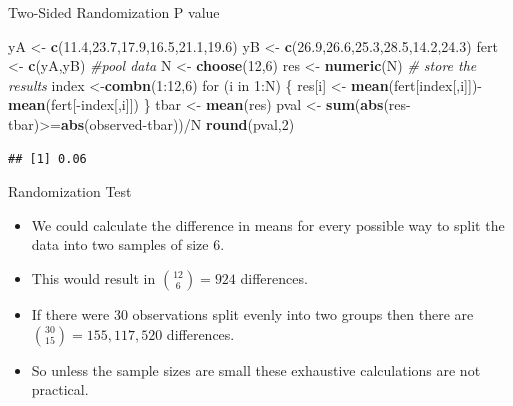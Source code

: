 \documentclass[9pt,ignorenonframetext,]{beamer}
\newenvironment{Shaded}{\begin{snugshade}}{\end{snugshade}}
\newcommand{\KeywordTok}[1]{\textcolor[rgb]{0.13,0.29,0.53}{\textbf{{#1}}}}
\newcommand{\DecValTok}[1]{\textcolor[rgb]{0.00,0.00,0.81}{{#1}}}
\newcommand{\FloatTok}[1]{\textcolor[rgb]{0.00,0.00,0.81}{{#1}}}
\newcommand{\StringTok}[1]{\textcolor[rgb]{0.31,0.60,0.02}{{#1}}}
\newcommand{\CommentTok}[1]{\textcolor[rgb]{0.56,0.35,0.01}{\textit{{#1}}}}
\newcommand{\NormalTok}[1]{{#1}}
\begin{document}
\begin{frame}[fragile]{Two-Sided Randomization P value}

\begin{Shaded}
\begin{Highlighting}[]
\NormalTok{yA <-}\StringTok{ }\KeywordTok{c}\NormalTok{(}\FloatTok{11.4}\NormalTok{,}\FloatTok{23.7}\NormalTok{,}\FloatTok{17.9}\NormalTok{,}\FloatTok{16.5}\NormalTok{,}\FloatTok{21.1}\NormalTok{,}\FloatTok{19.6}\NormalTok{)}
\NormalTok{yB <-}\StringTok{ }\KeywordTok{c}\NormalTok{(}\FloatTok{26.9}\NormalTok{,}\FloatTok{26.6}\NormalTok{,}\FloatTok{25.3}\NormalTok{,}\FloatTok{28.5}\NormalTok{,}\FloatTok{14.2}\NormalTok{,}\FloatTok{24.3}\NormalTok{)}
\NormalTok{fert <-}\StringTok{ }\KeywordTok{c}\NormalTok{(yA,yB) }\CommentTok{#pool data}
\NormalTok{N <-}\StringTok{ }\KeywordTok{choose}\NormalTok{(}\DecValTok{12}\NormalTok{,}\DecValTok{6}\NormalTok{)}
\NormalTok{res <-}\StringTok{ }\KeywordTok{numeric}\NormalTok{(N) }\CommentTok{# store the results}
\NormalTok{index <-}\KeywordTok{combn}\NormalTok{(}\DecValTok{1}\NormalTok{:}\DecValTok{12}\NormalTok{,}\DecValTok{6}\NormalTok{)}
\NormalTok{for (i in }\DecValTok{1}\NormalTok{:N)}
\NormalTok{\{}
  \NormalTok{res[i] <-}\StringTok{ }\KeywordTok{mean}\NormalTok{(fert[index[,i]])-}\KeywordTok{mean}\NormalTok{(fert[-index[,i]])}
\NormalTok{\}}
\NormalTok{tbar <-}\StringTok{ }\KeywordTok{mean}\NormalTok{(res)}
\NormalTok{pval <-}\StringTok{ }\KeywordTok{sum}\NormalTok{(}\KeywordTok{abs}\NormalTok{(res-tbar)>=}\KeywordTok{abs}\NormalTok{(observed-tbar))/N}
\KeywordTok{round}\NormalTok{(pval,}\DecValTok{2}\NormalTok{)}
\end{Highlighting}
\end{Shaded}

\begin{verbatim}
## [1] 0.06
\end{verbatim}

\end{frame}

\begin{frame}{Randomization Test}

\begin{itemize}
\item
  We could calculate the difference in means for every possible way to
  split the data into two samples of size 6.
\item
  This would result in \({12 \choose 6} =924\) differences.
\item
  If there were 30 observations split evenly into two groups then there
  are \({30 \choose 15}=155,117, 520\) differences.
\item
  So unless the sample sizes are small these exhaustive calculations are
  not practical.
\end{itemize}

\end{frame}
\end{document}

